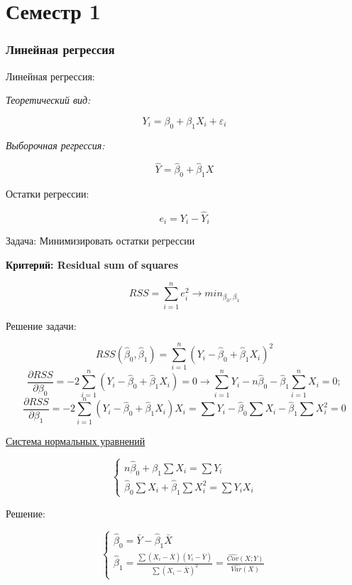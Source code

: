 \documentclass[a4paper, 12pt]{article}
\begin{document}
\tableofcontents
\pagebreak

\part{Семестр 1}

\section{Линейная регрессия}

Линейная регрессия:

\textit{Теоретический вид:}

\[Y_i = \beta_0 + \beta_1 X_i + \varepsilon_i\]

\textit{Выборочная регрессия:}

\[\hat{Y} = \hat{\beta}_0 + \hat{\beta}_1 X\]

Остатки регрессии:

\[e_i = Y_i - \hat{Y}_i\]

Задача: Минимизировать остатки регрессии

\textbf{Критерий: Residual sum of squares}

\[RSS = \sum_{i = 1}^{n} e^2_i \rightarrow min_{\beta_0, \beta_1}\]

Решение задачи:

\[RSS(\hat{\beta}_0, \hat{\beta}_1) = 
\sum_{i = 1}^n(Y_i - \hat{\beta}_0 + \hat{\beta}_1 X_i)^2\]
\[\frac{\partial RSS}{\partial \beta_0} = -2\sum_{i = 1}^n(Y_i - \hat{\beta}_0 + \hat{\beta}_1 X_i) = 0 \rightarrow
\sum_{i = 1}^n Y_i - n\hat{\beta}_0 - \hat{\beta}_1\sum_{i = 1}^n X_i = 0;
\]
\[\frac{\partial RSS}{\partial \beta_1} = 
-2 \sum_{i = 1}^n (Y_i - \hat{\beta}_0 + \hat{\beta}_1 X_i)X_i = 
\sum Y_i - \hat{\beta}_0 \sum X_i - \hat{\beta}_1 \sum X_i^2 = 0\]

\underline{Система нормальных уравнений}

\[\begin{cases}
    n \hat{\beta}_0 + \beta_1 \sum X_i = \sum Y_i \\
    \hat{\beta}_0 \sum X_i + \hat{\beta}_1 \sum X_i^2 = \sum Y_i X_i
\end{cases}
\]

Решение:

\[
\begin{cases}
    \hat{\beta}_0 = \bar{Y} - \hat{\beta}_1 \bar{X} \\
    \hat{\beta}_1 = \frac{\sum (X_i - \bar{X})(Y_i - \bar{Y})}{\sum (X_i - \bar{X})^2} = \frac{\hat{Cov}(X; Y)}{\hat{Var}(X)}    
\end{cases}
\]
\end{document}
